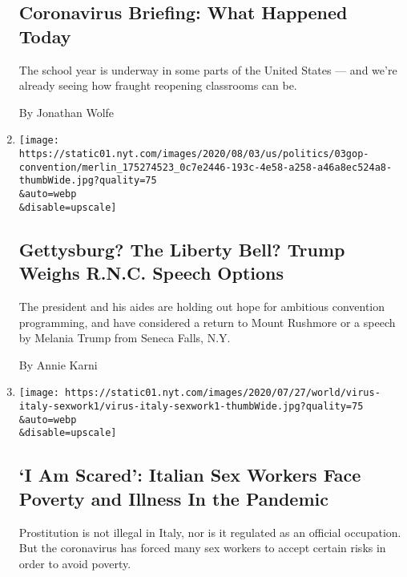 \begin{enumerate}
  \hypertarget{coronavirus-briefing-what-happened-today}{%
  \subsection{Coronavirus Briefing: What Happened
  Today}\label{coronavirus-briefing-what-happened-today}}

  The school year is underway in some parts of the United States --- and
  we're already seeing how fraught reopening classrooms can be.

  By Jonathan Wolfe
\item
  \href{/2020/08/03/us/politics/trump-rnc-speech.html}{}

  \texttt{[image: https://static01.nyt.com/images/2020/08/03/us/politics/03gop-convention/merlin\_175274523\_0c7e2446-193c-4e58-a258-a46a8ec524a8-thumbWide.jpg?quality=75\\\&auto=webp\\\&disable=upscale]}

  \hypertarget{gettysburg-the-liberty-bell-trump-weighs-rnc-speech-options}{%
  \subsection{Gettysburg? The Liberty Bell? Trump Weighs R.N.C. Speech
  Options}\label{gettysburg-the-liberty-bell-trump-weighs-rnc-speech-options}}

  The president and his aides are holding out hope for ambitious
  convention programming, and have considered a return to Mount Rushmore
  or a speech by Melania Trump from Seneca Falls, N.Y.

  By Annie Karni
\item
  \href{/2020/08/03/world/europe/italy-coronavirus-prostitution-sex-work.html}{}

  \texttt{[image: https://static01.nyt.com/images/2020/07/27/world/virus-italy-sexwork1/virus-italy-sexwork1-thumbWide.jpg?quality=75\\\&auto=webp\\\&disable=upscale]}

  \hypertarget{i-am-scared-italian-sex-workers-face-poverty-and-illness-in-the-pandemic}{%
  \subsection{`I Am Scared': Italian Sex Workers Face Poverty and
  Illness In the
  Pandemic}\label{i-am-scared-italian-sex-workers-face-poverty-and-illness-in-the-pandemic}}

  Prostitution is not illegal in Italy, nor is it regulated as an
  official occupation. But the coronavirus has forced many sex workers
  to accept certain risks in order to avoid poverty.


\end{enumerate}
